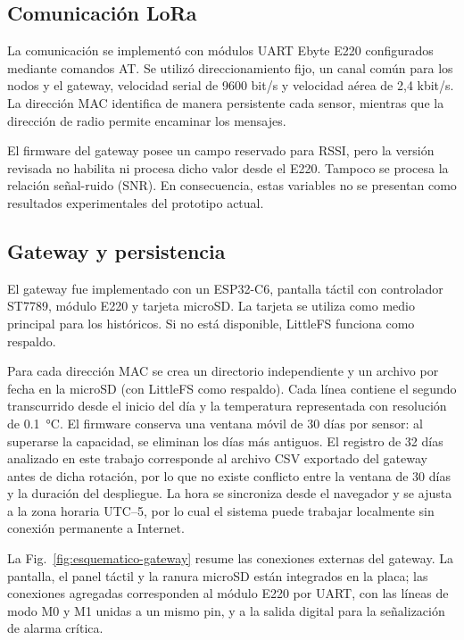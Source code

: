 \documentclass[conference]{IEEEtran}
\begin{document}
\subsection{Comunicación LoRa}

La comunicación se implementó con módulos UART Ebyte E220 configurados mediante comandos AT. Se utilizó direccionamiento fijo, un canal común para los nodos y el gateway, velocidad serial de 9600 bit/s y velocidad aérea de 2,4 kbit/s. La dirección MAC identifica de manera persistente cada sensor, mientras que la dirección de radio permite encaminar los mensajes.

El firmware del gateway posee un campo reservado para RSSI, pero la versión revisada no habilita ni procesa dicho valor desde el E220. Tampoco se procesa la relación señal-ruido (SNR). En consecuencia, estas variables no se presentan como resultados experimentales del prototipo actual.

\subsection{Gateway y persistencia}

El gateway fue implementado con un ESP32-C6, pantalla táctil con controlador ST7789, módulo E220 y tarjeta microSD. La tarjeta se utiliza como medio principal para los históricos. Si no está disponible, LittleFS funciona como respaldo.

Para cada dirección MAC se crea un directorio independiente y un archivo por fecha en la microSD (con LittleFS como respaldo). Cada línea contiene el segundo transcurrido desde el inicio del día y la temperatura representada con resolución de \SI{0.1}{\celsius}. El firmware conserva una ventana móvil de 30 días por sensor: al superarse la capacidad, se eliminan los días más antiguos. El registro de 32 días analizado en este trabajo corresponde al archivo CSV exportado del gateway antes de dicha rotación, por lo que no existe conflicto entre la ventana de 30 días y la duración del despliegue. La hora se sincroniza desde el navegador y se ajusta a la zona horaria UTC--5, por lo cual el sistema puede trabajar localmente sin conexión permanente a Internet.

La Fig.~\ref{fig:esquematico-gateway} resume las conexiones externas del gateway. La pantalla, el panel táctil y la ranura microSD están integrados en la placa; las conexiones agregadas corresponden al módulo E220 por UART, con las líneas de modo M0 y M1 unidas a un mismo pin, y a la salida digital para la señalización de alarma crítica.
\end{document}
